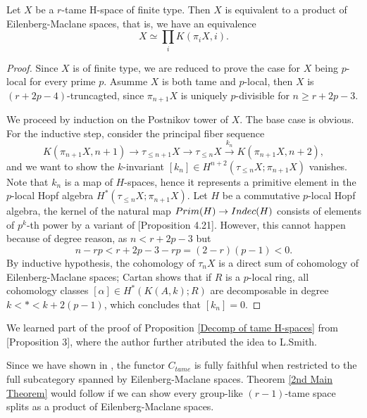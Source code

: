 \begin{proposition}
\label{Decomp of tame H-spaces}
	Let $X$ be a $r$-tame H-space of finite type. Then $X$ is equivalent to a product of Eilenberg-Maclane spaces, that is, we have an equivalence
	\[
	X \simeq \prod_i K(\pi_i X, i).
	\]
\end{proposition}
\begin{proof}
Since $X$ is of finite type, we are reduced to prove the case for $X$ being $p$-local for every prime $p$. Asumme $X$ is both tame and $p$-local, then $X$ is $(r+2p-4)$-truncagted, since $\pi_{n+1}X$ is uniquely $p$-divisible  for $n \geq r+2p-3$.

	We proceed by induction on the Postnikov tower of $X$.
	The base case is obvious. 	
	For the inductive step, consider the principal fiber sequence
	$$
	K(\pi_{n+1}X,n+1)\to 
	\tau_{\leq n+1}X
	\to
	\tau_{\leq n}X
	\xrightarrow{k_n}
	K(\pi_{n+1}X,n+2),
	$$
	and we want to show the $k$-invariant $[k_n]\in H^{n+2}(\tau_{\leq n}X; \pi_{n+1}X)$ vanishes. 
	Note that $k_n$ is a map of $H$-spaces, hence it represents a primitive element in the $p$-local Hopf algebra $H^*(\tau_{\leq n}X; \pi_{n+1}X)$. Let $H$ be a commutative $p$-local Hopf algebra, the kernel of the natural map $Prim(H)\to Indec(H)$ consists of elements of $p^k$-th power by a variant of \cite{Milnor-Moore}[Proposition 4.21]. However, this cannot happen because of degree reason, as
	$n<r+2p-3$ but
	\[
	n-rp<r+2p-3-rp= (2-r)(p-1)<0.
	\]
 	By inductive hypothesis, the cohomology of $\tau_n X$ is a direct sum of cohomology of Eilenberg-Maclane spaces;
	 Cartan shows that if $R$ is a $p$-local ring, all cohomology classes  $[\alpha]\in H^{*}(K(A,k);R)$ are decomposable in degree $k<*<k+2(p-1)$, which concludes that $[k_n]=0$.
\end{proof}
\begin{remark}
		We learned part of the proof of Proposition \ref{Decomp of tame H-spaces} from \cite{soule}[Proposition 3], where the author further atributed the idea to L.Smith.	
\end{remark}

Since we have shown in , the functor $C_{tame}$ is fully faithful when restricted to the full subcategory spanned by Eilenberg-Maclane spaces. 
Theorem \ref{2nd Main Theorem} would follow if we can show every group-like $(r-1)$-tame space splits as a product of Eilenberg-Maclane spaces.



